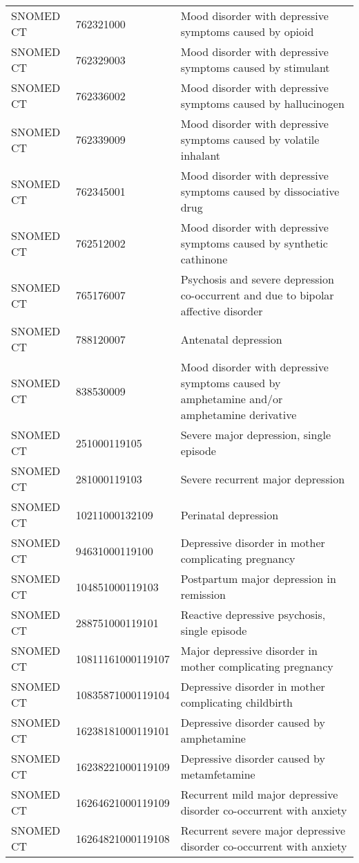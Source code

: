 \begin{longtable}{p{}p{}p{}}
  SNOMED CT & 762321000 & Mood disorder with depressive symptoms caused by opioid \\ 
  SNOMED CT & 762329003 & Mood disorder with depressive symptoms caused by stimulant \\ 
  SNOMED CT & 762336002 & Mood disorder with depressive symptoms caused by hallucinogen \\ 
  SNOMED CT & 762339009 & Mood disorder with depressive symptoms caused by volatile inhalant \\ 
  SNOMED CT & 762345001 & Mood disorder with depressive symptoms caused by dissociative drug \\ 
  SNOMED CT & 762512002 & Mood disorder with depressive symptoms caused by synthetic cathinone \\ 
  SNOMED CT & 765176007 & Psychosis and severe depression co-occurrent and due to bipolar affective disorder \\ 
  SNOMED CT & 788120007 & Antenatal depression \\ 
  SNOMED CT & 838530009 & Mood disorder with depressive symptoms caused by amphetamine and/or amphetamine derivative \\ 
  SNOMED CT & 251000119105 & Severe major depression, single episode \\ 
  SNOMED CT & 281000119103 & Severe recurrent major depression \\ 
  SNOMED CT & 10211000132109 & Perinatal depression \\ 
  SNOMED CT & 94631000119100 & Depressive disorder in mother complicating pregnancy \\ 
  SNOMED CT & 104851000119103 & Postpartum major depression in remission \\ 
  SNOMED CT & 288751000119101 & Reactive depressive psychosis, single episode \\ 
  SNOMED CT & 10811161000119107 & Major depressive disorder in mother complicating pregnancy \\ 
  SNOMED CT & 10835871000119104 & Depressive disorder in mother complicating childbirth \\ 
  SNOMED CT & 16238181000119101 & Depressive disorder caused by amphetamine \\ 
  SNOMED CT & 16238221000119109 & Depressive disorder caused by metamfetamine \\ 
  SNOMED CT & 16264621000119109 & Recurrent mild major depressive disorder co-occurrent with anxiety \\ 
  SNOMED CT & 16264821000119108 & Recurrent severe major depressive disorder co-occurrent with anxiety \\ 

\end{longtable}
